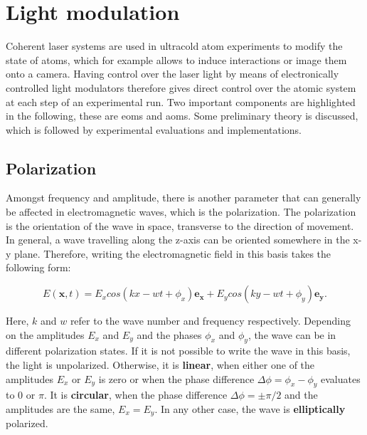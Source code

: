 \chapter{Light modulation}

Coherent laser systems are used in ultracold atom experiments to modify the state of atoms, which for example allows to induce interactions or image them onto a camera. Having control over the laser light by means of electronically controlled light modulators therefore gives direct control over the atomic system at each step of an experimental run.
Two important components are highlighted in the following, these are \acp{eom} and \acp{aom}. Some preliminary theory is discussed, which is followed by experimental evaluations and implementations.

\section{Polarization}

\label{sec:pol}

Amongst frequency and amplitude, there is another parameter that can generally be affected in electromagnetic waves, which is the polarization. The polarization is the orientation of the wave in space, transverse to the direction of movement. In general, a wave travelling along the z-axis can be oriented somewhere in the x-y plane. Therefore, writing the electromagnetic field in this basis takes the following form:

\begin{equation}
	E(\mathbf{x}, t) = E_x cos\left(kx - wt + \phi_x\right) \mathbf{e_x} + E_y cos\left(ky - wt + \phi_y\right) \mathbf{e_y} .
\end{equation}

Here, $k$ and $w$ refer to the wave number and frequency respectively.
Depending on the amplitudes $E_x$ and $E_y$ and the phases $\phi_x$ and $\phi_y$, the wave can be in different polarization states. If it is not possible to write the wave in this basis, the light is unpolarized. Otherwise, it is \textbf{linear}, when either one of the amplitudes $E_x$ or $E_y$ is zero or when the phase difference $\Delta \phi = \phi_x - \phi_y$ evaluates to 0 or $\pi$. It is \textbf{circular}, when the phase difference $\Delta \phi = \pm \pi/2$ and the amplitudes are the same, $E_x = E_y$. In any other case, the wave is \textbf{elliptically} polarized.

